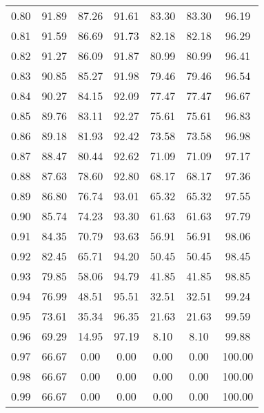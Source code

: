 \begin{tabular}{|c|c|c|c|c|c|c|}
      0.80 &     91.89 &     87.26 &      91.61 &   83.30 &      83.30 &         96.19 \\
      0.81 &     91.59 &     86.69 &      91.73 &   82.18 &      82.18 &         96.29 \\
      0.82 &     91.27 &     86.09 &      91.87 &   80.99 &      80.99 &         96.41 \\
      0.83 &     90.85 &     85.27 &      91.98 &   79.46 &      79.46 &         96.54 \\
      0.84 &     90.27 &     84.15 &      92.09 &   77.47 &      77.47 &         96.67 \\
      0.85 &     89.76 &     83.11 &      92.27 &   75.61 &      75.61 &         96.83 \\
      0.86 &     89.18 &     81.93 &      92.42 &   73.58 &      73.58 &         96.98 \\
      0.87 &     88.47 &     80.44 &      92.62 &   71.09 &      71.09 &         97.17 \\
      0.88 &     87.63 &     78.60 &      92.80 &   68.17 &      68.17 &         97.36 \\
      0.89 &     86.80 &     76.74 &      93.01 &   65.32 &      65.32 &         97.55 \\
      0.90 &     85.74 &     74.23 &      93.30 &   61.63 &      61.63 &         97.79 \\
      0.91 &     84.35 &     70.79 &      93.63 &   56.91 &      56.91 &         98.06 \\
      0.92 &     82.45 &     65.71 &      94.20 &   50.45 &      50.45 &         98.45 \\
      0.93 &     79.85 &     58.06 &      94.79 &   41.85 &      41.85 &         98.85 \\
      0.94 &     76.99 &     48.51 &      95.51 &   32.51 &      32.51 &         99.24 \\
      0.95 &     73.61 &     35.34 &      96.35 &   21.63 &      21.63 &         99.59 \\
      0.96 &     69.29 &     14.95 &      97.19 &    8.10 &       8.10 &         99.88 \\
      0.97 &     66.67 &      0.00 &       0.00 &    0.00 &       0.00 &        100.00 \\
      0.98 &     66.67 &      0.00 &       0.00 &    0.00 &       0.00 &        100.00 \\
      0.99 &     66.67 &      0.00 &       0.00 &    0.00 &       0.00 &        100.00 \\
\bottomrule
\end{tabular}
